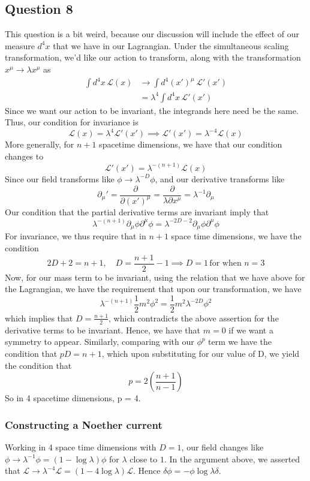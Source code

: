 \subsection{Question 8} 
This question is a bit weird, because our discussion will include the effect of our measure $d^4 x $ that we have in our Lagrangian. Under the simultaneous scaling transformation, we'd like our action to transform, along with the transformation $x^\mu \rightarrow \lambda x^\mu$ as 
\begin{align*}
\int d^4 x \, \mathcal{L} (x) & \rightarrow \int d^4 (x')^\mu  \,  \mathcal{L }'(x' ) \\ 
&= \lambda^4 \int d^4 x \,   \mathcal{L}' (x' ) 
\end{align*} 
Since we want our action to be invariant, the integrands here need be the same.
Thus, our condition for invariance is 
\[ 
\mathcal{L} (x)  = \lambda^4 \mathcal{L}'( x') \implies \mathcal{L}'(x ' )  = \lambda^{ -4} \mathcal{L} (x) 
\] 
More generally, for $n + 1$ spacetime dimensions, we have that our condition changes to 
\[ 
\mathcal{L}' (x ' ) = \lambda^{ -(n + 1)  } \mathcal{ L } (x)
\] 
Since our field transforms like $\phi \rightarrow \lambda^{ -D } \phi$, and our derivative transforms like
\[ 
\partial_\mu '  = \frac{ \partial }{ \partial( x' )^\mu} = \frac{ \partial}{ \lambda \partial x^\mu } = \lambda^{ -1} \partial_\mu \] 
Our condition that the partial derivative terms are invariant imply that 
\[
\lambda^{ -( n + 1)} \partial_\mu \phi \partial^\mu \phi = \lambda^{ - 2D - 2} \partial_\mu \phi \partial^\mu \phi 
\]      
For invariance, we thus require that in $n + 1$ space time dimensions, we have the condition\[ 
2D + 2 = n + 1, \quad D = \frac{ n + 1}{2}  -1  \implies D = 1 \,  \text{for when } n = 3 
\] 
Now, for our mass term to be invariant, using the relation that we have above for the Lagrangian, we have the requirement that upon our transformation, we have \[
\lambda^{  - (n + 1 ) } \frac{1}{2}m^2 \phi^2  = \frac{1}{2} m^2 \lambda^{ - 2D} \phi^2 
\] which implies that $D = \frac{ n + 1}{ 2} $, which contradicts the above assertion for the derivative terms to be invariant. Hence, we have that $m = 0$ if we want a symmetry to appear. Similarly, comparing with our $\phi^p$ term we have the condition that $pD  =  n + 1 $, which upon substituting for our value of D, we yield the condition that 
\[ 
p = 2 \left( \frac{ n + 1}{ n - 1 }  \right) 
\] 
So in 4 spacetime dimensions, p = 4. 

\subsubsection*{Constructing a Noether current} 
Working in 4 space time dimensions with $D = 1$, our field changes like $\phi \rightarrow \lambda^{ -1} \phi  = ( 1 - \log \lambda ) \phi$ for $\lambda $ close to $1$. In the argument above, we asserted that $\mathcal{ L} \rightarrow \lambda^{ - 4} \mathcal{L }  = ( 1  - 4 \log \lambda ) \mathcal{ L} $.  
Hence $\delta \phi  =  - \phi  \log \lambda \delta $.  
\pagebreak 
